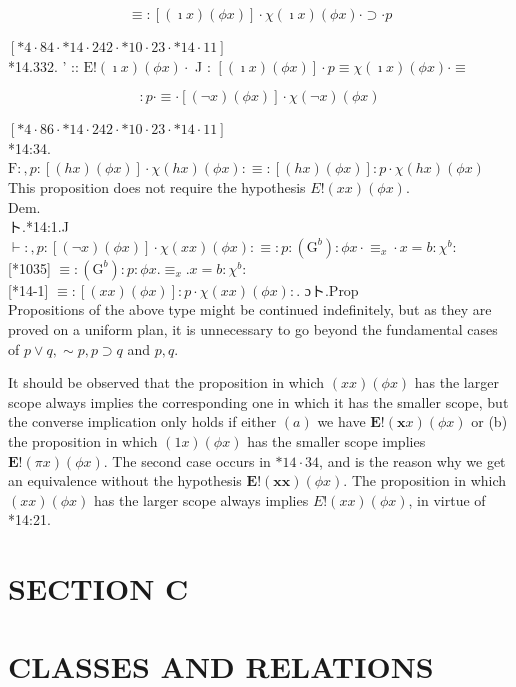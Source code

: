 \documentclass[10pt]{article}
\begin{document}
$$
\equiv:[(\imath x)(\phi x)] \cdot \chi(\imath x)(\phi x) \cdot \supset \cdot p
$$

$[* 4 \cdot 84 \cdot * 14 \cdot 242 \cdot * 10 \cdot 23 \cdot * 14 \cdot 11]$\\
*14.332. ' :: $\mathrm{E}!(\imath x)(\phi x) \cdot$ J : $[(\imath x)(\phi x)] \cdot p \equiv \chi(\imath x)(\phi x) \cdot \equiv$

$$
: p \cdot \equiv \cdot[(\neg x)(\phi x)] \cdot \chi(\neg x)(\phi x)
$$

$[* 4 \cdot 86 \cdot * 14 \cdot 242 \cdot * 10 \cdot 23 \cdot * 14 \cdot 11]$\\
*14:34. $\mathrm{F}:, p:[(h x)(\phi x)] \cdot \chi(h x)(\phi x): \equiv:[(h x)(\phi x)]: p \cdot \chi(h x)(\phi x)$\\
This proposition does not require the hypothesis $E!(x x)(\phi x)$.\\
Dem.\\
ト.*14:1.J\\
$\vdash:, p:[(\neg x)(\phi x)] \cdot \chi(x x)(\phi x): \equiv: p:\left(\mathrm{G}^{b}\right): \phi x \cdot \equiv_{x} \cdot x=b: \chi^{b}:$\\[0pt]
[*1035] $\equiv:\left(\mathrm{G}^{b}\right): p: \phi x . \equiv_{x} . x=b: \chi^{b}:$\\[0pt]
[*14-1] $\equiv:[(x x)(\phi x)]: p \cdot \chi(x x)(\phi x):$. ɔト.Prop\\
Propositions of the above type might be continued indefinitely, but as they are proved on a uniform plan, it is unnecessary to go beyond the fundamental cases of $p \vee q, \sim p, p \supset q$ and $p, q$.

It should be observed that the proposition in which $(x x)(\phi x)$ has the larger scope always implies the corresponding one in which it has the smaller scope, but the converse implication only holds if either $(a)$ we have $\mathbf{E}!(\boldsymbol{x} x)(\phi x)$ or (b) the proposition in which $(1 x)(\phi x)$ has the smaller scope implies $\mathbf{E}!(\pi x)(\phi x)$. The second case occurs in $* 14 \cdot 34$, and is the reason why we get an equivalence without the hypothesis $\mathbf{E}!(\boldsymbol{x} \boldsymbol{x})(\phi x)$. The proposition in which $(x x)(\phi x)$ has the larger scope always implies $E!(x x)(\phi x)$, in virtue of *14:21.

\section*{SECTION C}
\section*{CLASSES AND RELATIONS}
\end{document}
